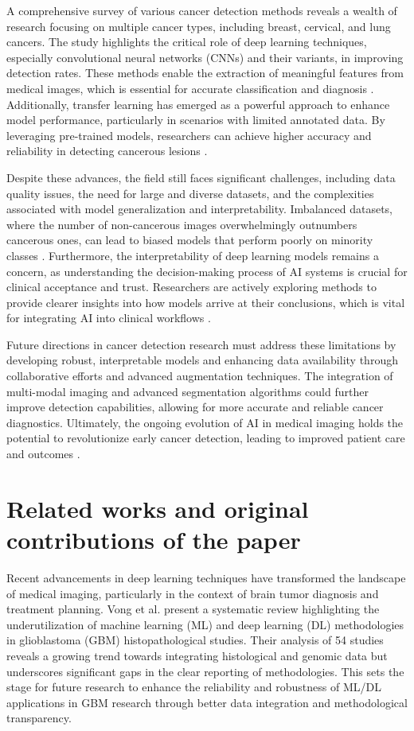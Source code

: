 \documentclass[runningheads]{llncs}
\begin{document}
A comprehensive survey of various cancer detection methods reveals a wealth of research focusing on multiple cancer types, including breast, cervical, and lung cancers. The study highlights the critical role of deep learning techniques, especially convolutional neural networks (CNNs) and their variants, in improving detection rates. These methods enable the extraction of meaningful features from medical images, which is essential for accurate classification and diagnosis \cite{Istiak_2024}. Additionally, transfer learning has emerged as a powerful approach to enhance model performance, particularly in scenarios with limited annotated data. By leveraging pre-trained models, researchers can achieve higher accuracy and reliability in detecting cancerous lesions \cite{Istiak_2024}.

Despite these advances, the field still faces significant challenges, including data quality issues, the need for large and diverse datasets, and the complexities associated with model generalization and interpretability. Imbalanced datasets, where the number of non-cancerous images overwhelmingly outnumbers cancerous ones, can lead to biased models that perform poorly on minority classes \cite{Istiak_2024}. Furthermore, the interpretability of deep learning models remains a concern, as understanding the decision-making process of AI systems is crucial for clinical acceptance and trust. Researchers are actively exploring methods to provide clearer insights into how models arrive at their conclusions, which is vital for integrating AI into clinical workflows \cite{Istiak_2024}.

Future directions in cancer detection research must address these limitations by developing robust, interpretable models and enhancing data availability through collaborative efforts and advanced augmentation techniques. The integration of multi-modal imaging and advanced segmentation algorithms could further improve detection capabilities, allowing for more accurate and reliable cancer diagnostics. Ultimately, the ongoing evolution of AI in medical imaging holds the potential to revolutionize early cancer detection, leading to improved patient care and outcomes \cite{Istiak_2024}.
\section{Related works and original contributions of the paper}
Recent advancements in deep learning techniques have transformed the landscape of medical imaging, particularly in the context of brain tumor diagnosis and treatment planning. Vong et al. \cite{Chun_2025} present a systematic review highlighting the underutilization of machine learning (ML) and deep learning (DL) methodologies in glioblastoma (GBM) histopathological studies. Their analysis of 54 studies reveals a growing trend towards integrating histological and genomic data but underscores significant gaps in the clear reporting of methodologies. This sets the stage for future research to enhance the reliability and robustness of ML/DL applications in GBM research through better data integration and methodological transparency.
\end{document}
